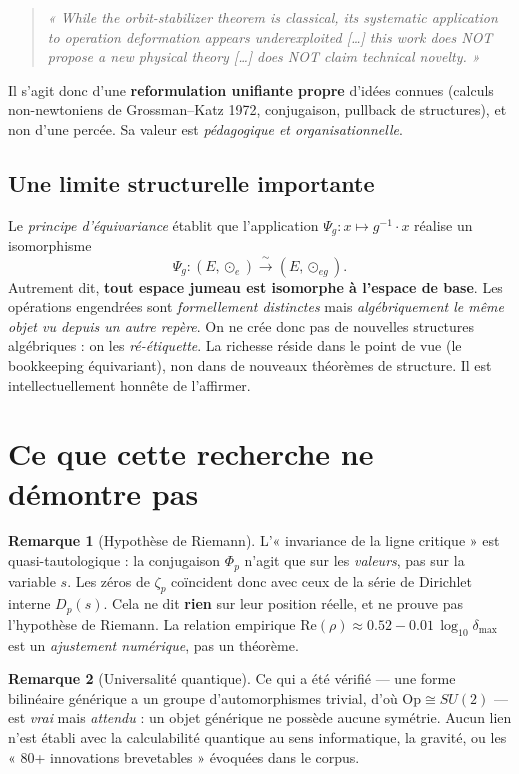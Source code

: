 \documentclass[11pt,a4paper]{article}
\newcommand{\Op}{\mathrm{Op}}
\theoremstyle{definition}
\newtheorem{remark}{Remarque}
\begin{document}
\begin{quote}\small\itshape
« While the orbit-stabilizer theorem is classical, its systematic application
to operation deformation appears underexploited [\dots] this work does NOT
propose a new physical theory [\dots] does NOT claim technical novelty. »
\end{quote}

\noindent
Il s'agit donc d'une \textbf{reformulation unifiante propre} d'idées connues
(calculs non-newtoniens de Grossman--Katz 1972, conjugaison, pullback de
structures), et non d'une percée. Sa valeur est \emph{pédagogique et
organisationnelle}.

\subsection{Une limite structurelle importante}

Le \emph{principe d'équivariance} établit que l'application
$\Psi_g : x \mapsto g^{-1}\cdot x$ réalise un isomorphisme
\[
\Psi_g : (E,\odot_e) \xrightarrow{\ \sim\ } (E,\odot_{eg}).
\]
Autrement dit, \textbf{tout espace jumeau est isomorphe à l'espace de base}. Les
opérations engendrées sont \emph{formellement distinctes} mais
\emph{algébriquement le même objet vu depuis un autre repère}. On ne crée donc
pas de nouvelles structures algébriques : on les \emph{ré-étiquette}. La richesse
réside dans le point de vue (le bookkeeping équivariant), non dans de nouveaux
théorèmes de structure. Il est intellectuellement honnête de l'affirmer.

\section{Ce que cette recherche ne démontre pas}

\begin{remark}[Hypothèse de Riemann]
L'« invariance de la ligne critique » est quasi-tautologique : la conjugaison
$\Phi_p$ n'agit que sur les \emph{valeurs}, pas sur la variable $s$. Les zéros de
$\zeta_p$ co\"incident donc avec ceux de la série de Dirichlet interne $D_p(s)$.
Cela ne dit \textbf{rien} sur leur position réelle, et ne prouve pas l'hypothèse
de Riemann. La relation empirique
$\mathrm{Re}(\rho)\approx 0.52 - 0.01\,\log_{10}\delta_{\max}$ est un
\emph{ajustement numérique}, pas un théorème.
\end{remark}

\begin{remark}[Universalité quantique]
Ce qui a été vérifié --- une forme bilinéaire générique a un groupe
d'automorphismes trivial, d'où $\Op\cong SU(2)$ --- est \emph{vrai} mais
\emph{attendu} : un objet générique ne possède aucune symétrie. Aucun lien n'est
établi avec la calculabilité quantique au sens informatique, la gravité, ou les
« 80+ innovations brevetables » évoquées dans le corpus.
\end{remark}
\end{document}
